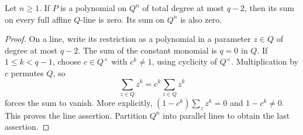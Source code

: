 \begin{lemma}
\label{lem:line-sums}
Let $n\ge1$. If $P$ is a polynomial on $Q^n$ of total degree at most $q-2$, then its sum on every full affine $Q$-line is zero. Its sum on $Q^n$ is also zero.
\end{lemma}
\begin{proof}
On a line, write its restriction as a polynomial in a parameter $z\in Q$ of degree at most $q-2$. The sum of the constant monomial is $q=0$ in $Q$. If $1\le k<q-1$, choose $c\in Q^\times$ with $c^k\ne1$, using cyclicity of $Q^\times$. Multiplication by $c$ permutes $Q$, so
\[
\sum_{z\in Q}z^k=c^k\sum_{z\in Q}z^k
\]
forces the sum to vanish. More explicitly, $(1-c^k)\sum_z z^k=0$ and $1-c^k\ne0$. This proves the line assertion. Partition $Q^n$ into parallel lines to obtain the last assertion.
\end{proof}

